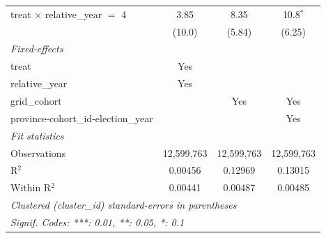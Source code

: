 \begin{tabular}{lccc}
   treat $\times$ relative\_year $=$ 4    & 3.85                & 8.35         & 10.8$^{*}$\\   
                                          & (10.0)              & (5.84)       & (6.25)\\   
   \midrule
   \emph{Fixed-effects}\\
   treat                                  & Yes                 &              & \\  
   relative\_year                         & Yes                 &              & \\  
   grid\_cohort                           &                     & Yes          & Yes\\  
   province-cohort\_id-election\_year     &                     &              & Yes\\  
   \midrule
   \emph{Fit statistics}\\
   Observations                           & 12,599,763          & 12,599,763   & 12,599,763\\  
   R$^2$                                  & 0.00456             & 0.12969      & 0.13015\\  
   Within R$^2$                           & 0.00441             & 0.00487      & 0.00485\\  
   \midrule \midrule
   \multicolumn{4}{l}{\emph{Clustered (cluster\_id) standard-errors in parentheses}}\\
   \multicolumn{4}{l}{\emph{Signif. Codes: ***: 0.01, **: 0.05, *: 0.1}}\\
\end{tabular}
\par\endgroup


